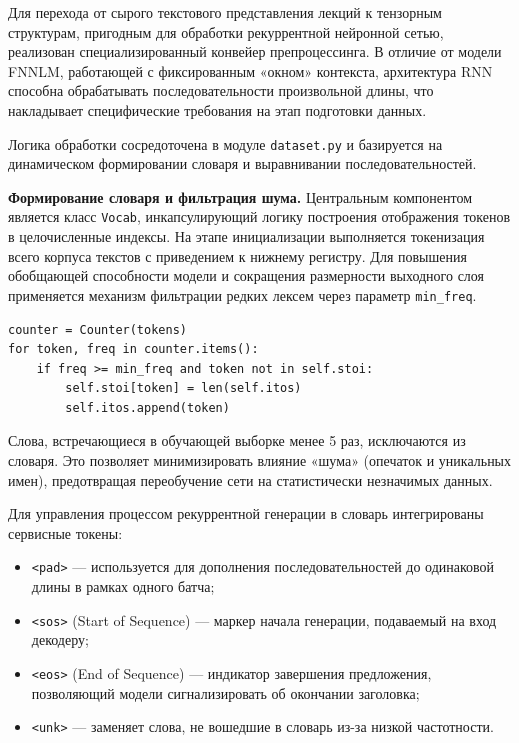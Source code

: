 \documentclass[coursework]{SCWorks}
\begin{document}
    Для перехода от сырого текстового представления лекций к тензорным структурам, пригодным для обработки рекуррентной нейронной сетью, реализован специализированный конвейер препроцессинга. В отличие от модели FNNLM, работающей с фиксированным «окном» контекста, архитектура RNN способна обрабатывать последовательности произвольной длины, что накладывает специфические требования на этап подготовки данных.

    Логика обработки сосредоточена в модуле \texttt{dataset.py} и базируется на динамическом формировании словаря и выравнивании последовательностей.

    \textbf{Формирование словаря и фильтрация шума.} Центральным компонентом является класс \texttt{Vocab}, инкапсулирующий логику построения отображения токенов в целочисленные индексы. На этапе инициализации выполняется токенизация всего корпуса текстов с приведением к нижнему регистру. Для повышения обобщающей способности модели и сокращения размерности выходного слоя применяется механизм фильтрации редких лексем через параметр \texttt{min\_freq}.

    \begin{verbatim}
counter = Counter(tokens)
for token, freq in counter.items():
    if freq >= min_freq and token not in self.stoi:
        self.stoi[token] = len(self.itos)
        self.itos.append(token)
    \end{verbatim}

    Слова, встречающиеся в обучающей выборке менее 5 раз, исключаются из словаря. Это позволяет минимизировать влияние «шума» (опечаток и уникальных имен), предотвращая переобучение сети на статистически незначимых данных.

    Для управления процессом рекуррентной генерации в словарь интегрированы сервисные токены:
    \begin{itemize}
        \item \texttt{<pad>} — используется для дополнения последовательностей до одинаковой длины в рамках одного батча;
        \item \texttt{<sos>} (Start of Sequence) — маркер начала генерации, подаваемый на вход декодеру;
        \item \texttt{<eos>} (End of Sequence) — индикатор завершения предложения, позволяющий модели сигнализировать об окончании заголовка;
        \item \texttt{<unk>} — заменяет слова, не вошедшие в словарь из-за низкой частотности.
    \end{itemize}
\end{document}
